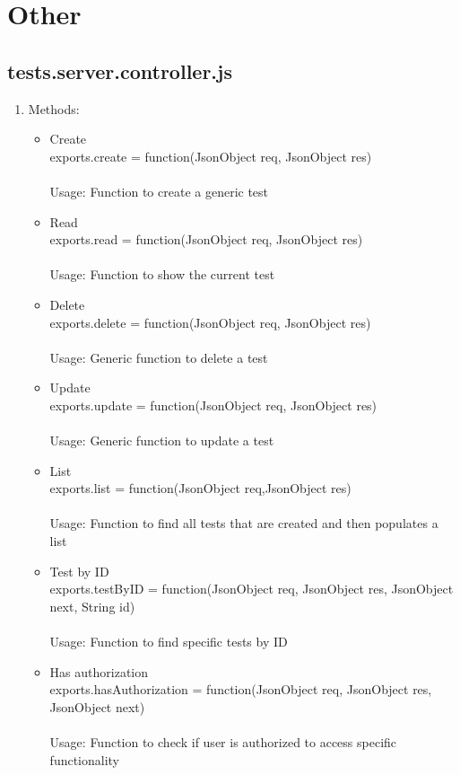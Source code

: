 \documentclass[a4paper,12pt]{article}
\begin{document}
\section{Other}
\subsection{tests.server.controller.js}
\begin{enumerate}
	\item Methods:
	\begin{itemize}
		\item Create \\ exports.create = function(JsonObject req, JsonObject res) 
		\\ \\ Usage: Function to create a generic test
		\item Read \\ exports.read = function(JsonObject req, JsonObject res) 
		\\ \\ Usage: Function to show the current test
		\item Delete \\ exports.delete = function(JsonObject req, JsonObject res) 
		\\ \\ Usage: Generic function to delete a test
		\item Update \\ exports.update = function(JsonObject req, JsonObject res) 
		\\ \\ Usage: Generic function to update a test 
		\item List \\ exports.list = function(JsonObject req,JsonObject res)
		\\ \\ Usage: Function to find all tests that are created and then populates a list
		\item Test by ID \\ exports.testByID = function(JsonObject req, JsonObject res, JsonObject next, String id)
		\\ \\ Usage: Function to find specific tests by ID
		\item Has authorization \\ exports.hasAuthorization = function(JsonObject req, JsonObject res, JsonObject next)
		\\ \\ Usage: Function to check if user is authorized to access specific functionality
	\end{itemize}
\end{enumerate}
\end{document}
